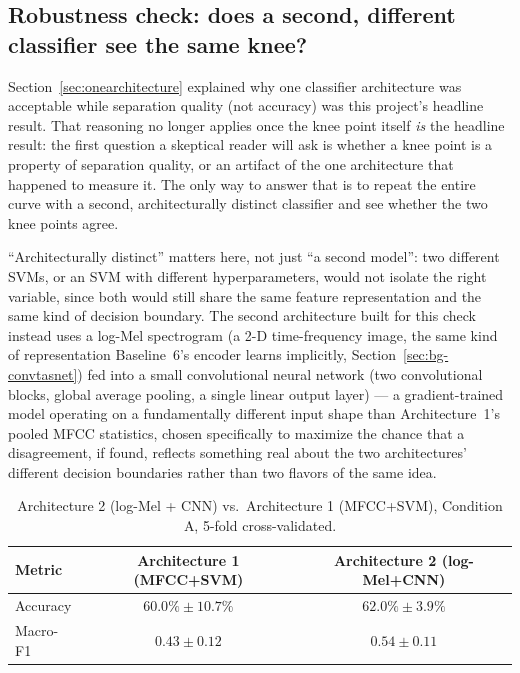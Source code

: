 \documentclass[11pt]{article}
\begin{document}
\subsection{Robustness check: does a second, different classifier see the
same knee?}
\label{sec:robustness}

Section~\ref{sec:onearchitecture} explained why one classifier
architecture was acceptable while separation quality (not accuracy) was
this project's headline result. That reasoning no longer applies once the
knee point itself \emph{is} the headline result: the first question a
skeptical reader will ask is whether a knee point is a property of
separation quality, or an artifact of the one architecture that happened
to measure it. The only way to answer that is to repeat the entire curve
with a second, architecturally distinct classifier and see whether the two
knee points agree.

``Architecturally distinct'' matters here, not just ``a second model'':
two different SVMs, or an SVM with different hyperparameters, would not
isolate the right variable, since both would still share the same feature
representation and the same kind of decision boundary. The second
architecture built for this check instead uses a log-Mel spectrogram (a
2-D time-frequency image, the same kind of representation Baseline~6's
encoder learns implicitly, Section~\ref{sec:bg-convtasnet}) fed into a
small convolutional neural network (two convolutional blocks, global
average pooling, a single linear output layer) --- a gradient-trained
model operating on a fundamentally different input shape than Architecture~1's
pooled MFCC statistics, chosen specifically to maximize the chance that a
disagreement, if found, reflects something real about the two
architectures' different decision boundaries rather than two flavors of
the same idea.

\begin{table}[H]
\centering
\caption{Architecture 2 (log-Mel + CNN) vs.\ Architecture 1 (MFCC+SVM), Condition A, 5-fold cross-validated.}
\label{tab:arch2}
\begin{tabular}{@{}lcc@{}}
\toprule
Metric & Architecture 1 (MFCC+SVM) & Architecture 2 (log-Mel+CNN) \\
\midrule
Accuracy & $60.0\% \pm 10.7\%$ & $62.0\% \pm 3.9\%$ \\
Macro-F1 & $0.43 \pm 0.12$    & $0.54 \pm 0.11$ \\
\bottomrule
\end{tabular}
\end{table}
\end{document}
